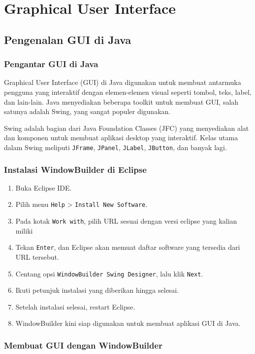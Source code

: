 \chapter{Graphical User Interface}


\section{Pengenalan GUI di Java}

\subsection{Pengantar GUI di Java}
Graphical User Interface (GUI) di Java digunakan untuk membuat antarmuka pengguna yang interaktif dengan elemen-elemen visual seperti tombol, teks, label, dan lain-lain. Java menyediakan beberapa toolkit untuk membuat GUI, salah satunya adalah Swing, yang sangat populer digunakan.

Swing adalah bagian dari Java Foundation Classes (JFC) yang menyediakan alat dan komponen untuk membuat aplikasi desktop yang interaktif. Kelas utama dalam Swing meliputi \texttt{JFrame}, \texttt{JPanel}, \texttt{JLabel}, \texttt{JButton}, dan banyak lagi.

\subsection{Instalasi WindowBuilder di Eclipse}

\begin{enumerate}
	\item Buka Eclipse IDE.
	\item Pilih menu \texttt{Help} > \texttt{Install New Software}.
	\item Pada kotak \texttt{Work with}, pilih URL sesuai dengan versi eclipse yang kalian miliki
	\item Tekan \texttt{Enter}, dan Eclipse akan memuat daftar software yang tersedia dari URL tersebut.
	\item Centang opsi \texttt{WindowBuilder Swing Designer}, lalu klik \texttt{Next}.
	\item Ikuti petunjuk instalasi yang diberikan hingga selesai.
	\item Setelah instalasi selesai, restart Eclipse.
	\item WindowBuilder kini siap digunakan untuk membuat aplikasi GUI di Java.
\end{enumerate}


\subsection{Membuat GUI dengan WindowBuilder}


